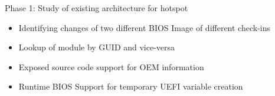 \begin{frame}{Phase 1: Study of existing architecture for hotspot}
	\begin{itemize}
		\item Identifying changes of two different BIOS Image of different check-ins
		\item Lookup of module by GUID and vice-versa
		\item Exposed source code support for OEM information
		\item Runtime BIOS Support for temporary UEFI variable creation
	\end{itemize}
\end{frame}
